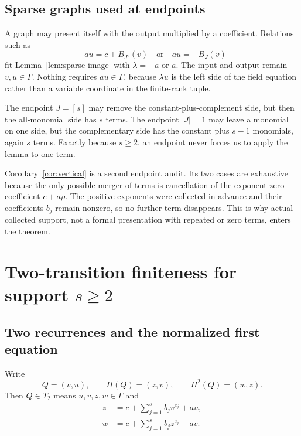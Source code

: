 \documentclass[11pt]{article}
\theoremstyle{definition}
\begin{document}
\subsection{Sparse graphs used at endpoints}

A graph may present itself with the output multiplied by a coefficient. Relations such as
\[
 -au=c+B_{J^c}(v)
 \quad\text{or}\quad
 au=-B_J(v)
\]
fit Lemma~\ref{lem:sparse-image} with \(\lambda=-a\) or \(a\). The input and output remain \(v,u\in\Gamma\). Nothing requires \(au\in\Gamma\), because \(\lambda u\) is the left side of the field equation rather than a variable coordinate in the finite-rank tuple.

The endpoint \(J=[s]\) may remove the constant-plus-complement side, but then the all-monomial side has \(s\) terms. The endpoint \(|J|=1\) may leave a monomial on one side, but the complementary side has the constant plus \(s-1\) monomials, again \(s\) terms. Exactly because \(s\geq2\), an endpoint never forces us to apply the lemma to one term.

Corollary~\ref{cor:vertical} is a second endpoint audit. Its two cases are exhaustive because the only possible merger of terms is cancellation of the exponent-zero coefficient \(c+a\rho\). The positive exponents were collected in advance and their coefficients \(b_j\) remain nonzero, so no further term disappears. This is why actual collected support, not a formal presentation with repeated or zero terms, enters the theorem.

\section{Two-transition finiteness for support \texorpdfstring{\(s\geq2\)}{s at least 2}}
\label{sec:pc1proof}

\subsection{Two recurrences and the normalized first equation}

Write
\begin{equation}
 Q=(v,u),\qquad H(Q)=(z,v),\qquad H^2(Q)=(w,z).
 \label{eq:three-states}
\end{equation}
Then \(Q\in T_2\) means \(u,v,z,w\in\Gamma\) and
\begin{align}
 z&=c+\sum_{j=1}^{s}b_jv^{e_j}+au,
 \label{eq:first-recurrence}\\
 w&=c+\sum_{j=1}^{s}b_jz^{e_j}+av.
 \label{eq:second-recurrence}
\end{align}
\end{document}
